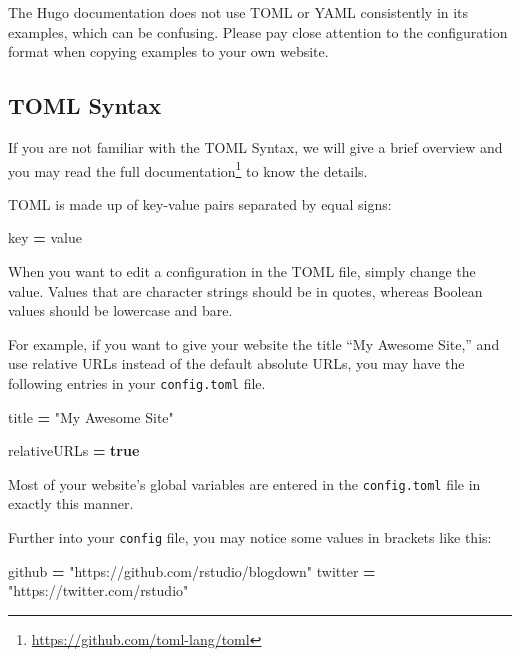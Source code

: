 \documentclass[12pt,]{krantz}
\makeatletter
\newenvironment{Shaded}{\begin{snugshade}}{\end{snugshade}}
\newcommand{\KeywordTok}[1]{\textcolor[rgb]{0.13,0.29,0.53}{\textbf{#1}}}
\newcommand{\StringTok}[1]{\textcolor[rgb]{0.31,0.60,0.02}{#1}}
\newcommand{\OperatorTok}[1]{\textcolor[rgb]{0.81,0.36,0.00}{\textbf{#1}}}
\newcommand{\NormalTok}[1]{#1}
\renewcommand{\href}[2]{#2\footnote{\url{#1}}}
\newenvironment{kframe}{%
\medskip{}
\setlength{\fboxsep}{.8em}
 \def\at@end@of@kframe{}%
 \ifinner\ifhmode%
  \def\at@end@of@kframe{\end{minipage}}%
  \begin{minipage}{\columnwidth}%
 \fi\fi%
 \def\FrameCommand##1{\hskip\@totalleftmargin \hskip-\fboxsep
 \colorbox{shadecolor}{##1}\hskip-\fboxsep
     \hskip-\linewidth \hskip-\@totalleftmargin \hskip\columnwidth}%
 \MakeFramed {\advance\hsize-\width
   \@totalleftmargin\z@ \linewidth\hsize
   \@setminipage}}%
 {\par\unskip\endMakeFramed%
 \at@end@of@kframe}
\renewenvironment{Shaded}{\begin{kframe}}{\end{kframe}}
\theoremstyle{definition}
\theoremstyle{definition}
\theoremstyle{definition}
\theoremstyle{remark}
\makeatother
\begin{document}
The Hugo documentation does not use TOML or YAML consistently in its
examples, which can be confusing. Please pay close attention to the
configuration format when copying examples to your own website.

\subsection{TOML Syntax}\label{toml-syntax}

If you are not familiar with the TOML Syntax, we will give a brief
overview and you may read the
\href{https://github.com/toml-lang/toml}{full documentation} to know the
details.

TOML is made up of key-value pairs separated by equal signs:

\begin{Shaded}
\begin{Highlighting}[]
\NormalTok{key }\OperatorTok{=}\NormalTok{ value}
\end{Highlighting}
\end{Shaded}

When you want to edit a configuration in the TOML file, simply change
the value. Values that are character strings should be in quotes,
whereas Boolean values should be lowercase and bare.

For example, if you want to give your website the title ``My Awesome
Site,'' and use relative URLs instead of the default absolute URLs, you
may have the following entries in your \texttt{config.toml} file.

\begin{Shaded}
\begin{Highlighting}[]
\NormalTok{title }\OperatorTok{=} \StringTok{"My Awesome Site"}

\NormalTok{relativeURLs }\OperatorTok{=} \KeywordTok{true}
\end{Highlighting}
\end{Shaded}

Most of your website's global variables are entered in the
\texttt{config.toml} file in exactly this manner.

Further into your \texttt{config} file, you may notice some values in
brackets like this:

\begin{Shaded}
\begin{Highlighting}[]
\NormalTok{[social]}
\NormalTok{    github  }\OperatorTok{=} \StringTok{"https://github.com/rstudio/blogdown"}
\NormalTok{    twitter }\OperatorTok{=} \StringTok{"https://twitter.com/rstudio"}
\end{Highlighting}
\end{Shaded}
\end{document}
